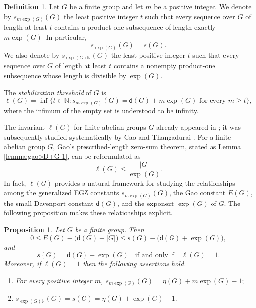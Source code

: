 \documentclass[a4paper, 12pt]{article}
\newtheorem{proposition}[theorem]{Proposition}
\theoremstyle{definition}
\newtheorem{definition}[theorem]{Definition}
\begin{document}
\begin{definition} Let $G$ be a finite group and let $m$ be a positive integer. We denote
by $s_{m\exp(G)}(G)$ the least positive integer $t$ such that every
sequence over $G$ of length at least $t$ contains a product-one
subsequence of length exactly $m\exp(G)$. In particular,
$$s_{\exp(G)}(G)=s(G).$$
We also denote by $s_{\exp(G)\mathbb N}(G)$ the least positive integer
$t$ such that every sequence over $G$ of length at least $t$ contains
a nonempty product-one subsequence whose length is divisible by
$\exp(G)$.

The \emph{stabilization threshold} of $G$ is
$$\ell(G)=\inf\bigl\{t\in\mathbb N:
s_{m\exp(G)}(G)=\mathsf d(G)+m\exp(G)
\text{ for every }m\geq t\bigr\},$$
where the infimum of the empty set is understood to be infinity.
\end{definition}

The invariant $\ell(G)$ for finite abelian groups $G$ already appeared in
\cite[Definition 3.5]{GaoRestrictedII}; it was subsequently studied
systematically by Gao and Thangadurai \cite{GaoThangadurai}.
For a finite abelian group $G$, Gao's prescribed-length zero-sum
theorem, stated as Lemma \ref{lemma:gao>D+G-1}, can be reformulated as
$$\ell(G)\leq\frac{|G|}{\exp(G)}.$$
In fact, $\ell(G)$ provides a natural framework for studying the
relationships among the generalized EGZ constants $s_{m\exp(G)}(G)$, the Gao constant $E(G)$,
the small Davenport constant $\mathsf d(G)$, and the exponent $\exp(G)$ of $G$. The following
proposition makes these relationships explicit.

\begin{proposition}\label{proposition:ifsg=d+exp}
Let $G$ be a finite group.  Then $$0\leq E(G)-\bigl(\mathsf d(G)+|G|\bigr)
\leq s(G)-\bigl(\mathsf d(G)+\exp(G)\bigr),$$
and $$s(G)=\mathsf d(G)+\exp(G) \quad \text{if and only if} \quad \ell(G)=1.$$ Moreover, if $\ell(G)=1$ then the following assertions hold.
\begin{enumerate}[label=\rm(\roman*)]
\item For every positive integer $m$,
$s_{m\exp(G)}(G)=\eta(G)+m\exp(G)-1;$
\item $s_{\exp(G)\mathbb N}(G)
=s(G)
=\eta(G)+\exp(G)-1.$
\end{enumerate}
\end{proposition}
\end{document}
